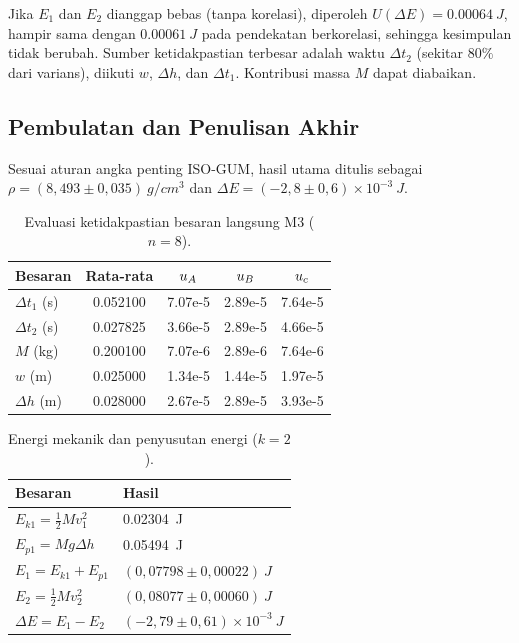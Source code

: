 \documentclass[a4paper, 12pt]{article}
\begin{document}
        Jika $E_1$ dan $E_2$ dianggap bebas (tanpa korelasi), diperoleh $U(\Delta E)=\SI{0,00064}{J}$, hampir sama dengan $\SI{0,00061}{J}$ pada pendekatan berkorelasi, sehingga kesimpulan tidak berubah. Sumber ketidakpastian terbesar adalah waktu $\Delta t_2$ (sekitar $80\%$ dari varians), diikuti $w$, $\Delta h$, dan $\Delta t_1$. Kontribusi massa $M$ dapat diabaikan.

        \subsection{Pembulatan dan Penulisan Akhir}
        Sesuai aturan angka penting ISO-GUM, hasil utama ditulis sebagai $\rho=(8{,}493\pm0{,}035)\ \si{g/cm^3}$ dan $\Delta E=(-2{,}8\pm0{,}6)\times10^{-3}\ \si{J}$.

\begin{table}[H]
\centering
\singlespacing
\caption{Evaluasi ketidakpastian besaran langsung M3 ($n=8$).}
\label{tab:uM3}
\small
\begin{tabular}{l S[table-format=1.6] S[table-format=1.2e-1] S[table-format=1.2e-1] S[table-format=1.2e-1]}
\toprule
\textbf{Besaran} & {Rata-rata} & {$u_{A}$} & {$u_{B}$} & {$u_{c}$}\\
\midrule
$\Delta t_1$ (s) & 0.052100 & 7.07e-5 & 2.89e-5 & 7.64e-5\\
$\Delta t_2$ (s) & 0.027825 & 3.66e-5 & 2.89e-5 & 4.66e-5\\
$M$ (kg) & 0.200100 & 7.07e-6 & 2.89e-6 & 7.64e-6\\
$w$ (m) & 0.025000 & 1.34e-5 & 1.44e-5 & 1.97e-5\\
$\Delta h$ (m) & 0.028000 & 2.67e-5 & 2.89e-5 & 3.93e-5\\
\bottomrule
\end{tabular}
\end{table}

\begin{table}[H]
\centering
\singlespacing
\caption{Energi mekanik dan penyusutan energi ($k=2$).}
\label{tab:E}
\small
\begin{tabular}{l l}
\toprule
\textbf{Besaran} & \textbf{Hasil}\\
\midrule
$E_{k1}=\tfrac{1}{2}Mv_1^2$ & \SI{0,02304}{J}\\
$E_{p1}=Mg\Delta h$ & \SI{0,05494}{J}\\
$E_1=E_{k1}+E_{p1}$ & $(0{,}07798\pm0{,}00022)\ \si{J}$\\
$E_2=\tfrac{1}{2}Mv_2^2$ & $(0{,}08077\pm0{,}00060)\ \si{J}$\\
$\Delta E=E_1-E_2$ & $(-2{,}79\pm0{,}61)\times10^{-3}\ \si{J}$\\
\bottomrule
\end{tabular}
\end{table}
\end{document}
